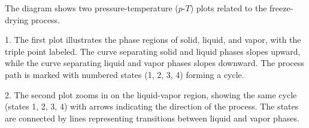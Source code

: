 The diagram shows two pressure-temperature (\(p\)-\(T\)) plots related to the freeze-drying process.  

1. The first plot illustrates the phase regions of solid, liquid, and vapor, with the triple point labeled. The curve separating solid and liquid phases slopes upward, while the curve separating liquid and vapor phases slopes downward. The process path is marked with numbered states (1, 2, 3, 4) forming a cycle.  

2. The second plot zooms in on the liquid-vapor region, showing the same cycle (states 1, 2, 3, 4) with arrows indicating the direction of the process. The states are connected by lines representing transitions between liquid and vapor phases.